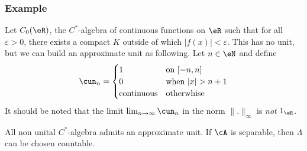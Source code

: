 \subsubsection*{Example}

Let $C_0(\eR)$, the $C^*$-algebra of continuous functions on $\eR$ such that for all $\varepsilon>0$, there exists a compact $K$ outside of which $| f(x) |<\varepsilon$. This has no unit, but we can build an approximate unit as following. Let $n\in\eN$ and define
\[ 
  \cun_n=
\begin{cases}
 1& \textrm{on $[-n,n]$}\\
 0&\textrm{when $| x |>n+1$}\\
\textrm{continuous}&\textrm{otherwhise}
\end{cases}
\]
It should be noted that the limit $\lim_{n\to\infty}\cun_n$ in the norm  $\| . \|_{\infty}$ is \emph{not} $1_{\eR}$. 

\begin{proposition}
All non unital $C^*$-algebra admits an approximate unit. If $\cA$ is separable, then $\Lambda$ can be chosen countable.
\end{proposition}

